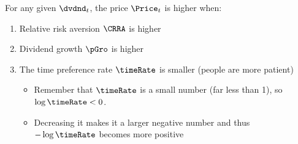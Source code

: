 \documentclass{\handout}
\begin{document}
\noindent For any given $\dvdnd_{t}$, the price $\Price_{t}$ is higher when:
\begin{enumerate}
\item Relative risk aversion $\CRRA$ is higher
\item Dividend growth $\pGro$ is higher
\item The time preference rate $\timeRate$ is smaller (people are more patient)
  \begin{itemize}
  \item Remember that $\timeRate$ is a small number (far less than 1), so $\log \timeRate < 0$.
    \item Decreasing it makes it a larger negative number and thus $-\log \timeRate$ becomes more positive
    \end{itemize}
\end{enumerate}

% 
\end{document}
